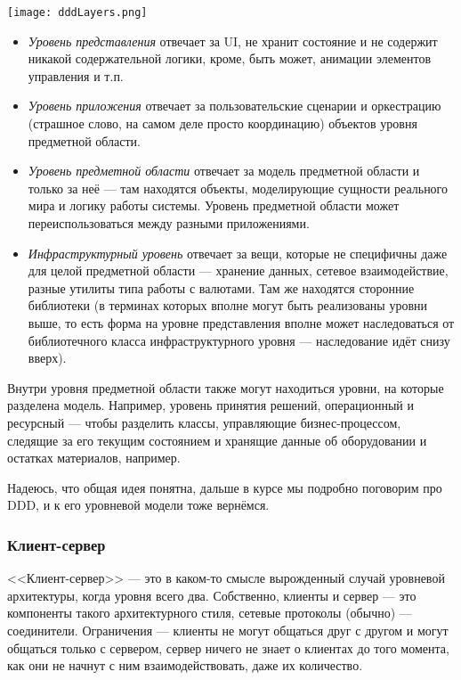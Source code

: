 \documentclass{../../text-style}
\begin{document}
\begin{center}
    \texttt{[image: dddLayers.png]}
\end{center}

\begin{itemize}
    \item \emph{Уровень представления} отвечает за UI, не хранит состояние и не содержит никакой содержательной логики, кроме, быть может, анимации элементов управления и т.п.
    \item \emph{Уровень приложения} отвечает за пользовательские сценарии и оркестрацию (страшное слово, на самом деле просто координацию) объектов уровня предметной области.
    \item \emph{Уровень предметной области} отвечает за модель предметной области и только за неё --- там находятся объекты, моделирующие сущности реального мира и логику работы системы. Уровень предметной области может переиспользоваться между разными приложениями.
    \item \emph{Инфраструктурный уровень} отвечает за вещи, которые не специфичны даже для целой предметной области --- хранение данных, сетевое взаимодействие, разные утилиты типа работы с валютами. Там же находятся сторонние библиотеки (в терминах которых вполне могут быть реализованы уровни выше, то есть форма на уровне представления вполне может наследоваться от библиотечного класса инфраструктурного уровня --- наследование идёт снизу вверх).
\end{itemize}

Внутри уровня предметной области также могут находиться уровни, на которые разделена модель. Например, уровень принятия решений, операционный и ресурсный --- чтобы разделить классы, управляющие бизнес-процессом, следящие за его текущим состоянием и хранящие данные об оборудовании и остатках материалов, например.

Надеюсь, что общая идея понятна, дальше в курсе мы подробно поговорим про DDD, и к его уровневой модели тоже вернёмся.

\subsubsection{Клиент-сервер}

<<Клиент-сервер>> --- это в каком-то смысле вырожденный случай уровневой архитектуры, когда уровня всего два. Собственно, клиенты и сервер --- это компоненты такого архитектурного стиля, сетевые протоколы (обычно) --- соединители. Ограничения --- клиенты не могут общаться друг с другом и могут общаться только с сервером, сервер ничего не знает о клиентах до того момента, как они не начнут с ним взаимодействовать, даже их количество. 
\end{document}
